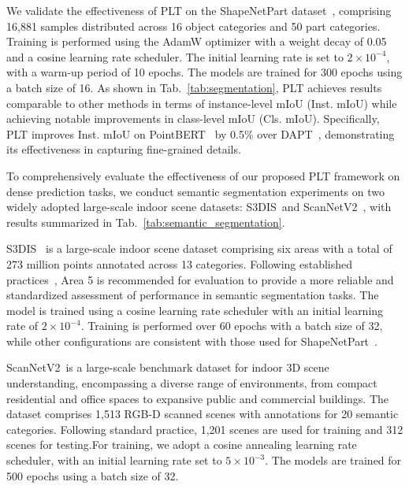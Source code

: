 We validate the effectiveness of PLT on the ShapeNetPart dataset~\cite{yi2016scalable}, comprising 16,881 samples distributed across 16 object categories and 50 part categories. Training is performed using the AdamW optimizer with a weight decay of 0.05 and a cosine learning rate scheduler. The initial learning rate is set to $2 \times 10^{-4}$, with a warm-up period of 10 epochs. The models are trained for 300 epochs using a batch size of 16. As shown in Tab.~\ref{tab:segmentation}, PLT achieves results comparable to other methods in terms of instance-level mIoU (Inst. mIoU) while achieving notable improvements in class-level mIoU (Cls. mIoU). Specifically, PLT improves Inst. mIoU on PointBERT~\cite{yu2022point} by 0.5\% over DAPT~\cite{zhou2024dynamic}, demonstrating its effectiveness in capturing fine-grained details.



To comprehensively evaluate the effectiveness of our proposed PLT framework on dense prediction tasks, we conduct semantic segmentation experiments on two widely adopted large-scale indoor scene datasets: S3DIS~\cite{armeni20163d}and ScanNetV2~\cite{dai2017scannet}, with results summarized in Tab.~\ref{tab:semantic_segmentation}. 

S3DIS~\cite{armeni20163d} is a large-scale indoor scene dataset comprising six areas with a total of 273 million points annotated across 13 categories. Following established practices~\cite{dong2022autoencoders}, Area 5 is recommended for evaluation to provide a more reliable and standardized assessment of performance in semantic segmentation tasks. The model is trained using a cosine learning rate scheduler with an initial learning rate of $2 \times 10^{-4}$. Training is performed over 60 epochs with a batch size of 32, while other configurations are consistent with those used for ShapeNetPart~\cite{yi2016scalable}.

ScanNetV2~\cite{dai2017scannet}is a large-scale benchmark dataset for indoor 3D scene understanding, encompassing a diverse range of environments, from compact residential and office spaces to expansive public and commercial buildings. The dataset comprises 1,513 RGB-D scanned scenes with annotations for 20 semantic categories. Following standard practice, 1,201 scenes are used for training and 312 scenes for testing.For training, we adopt a cosine annealing learning rate scheduler, with an initial learning rate set to $5 \times 10^{-3}$. The models are trained for 500 epochs using a batch size of 32.

